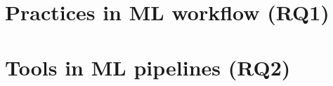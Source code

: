 




\section{\textbf{Practices in ML workflow (RQ1)}}
\label{sec:practices}







%







\section{\textbf{Tools in ML pipelines (RQ2)}}
\label{sec:tools}






\label{sec:challenges}
% 

